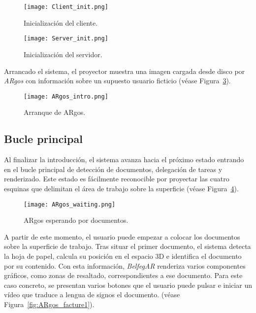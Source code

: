 \begin{figure}[!h]
  \begin{center}
    \texttt{[image: Client\_init.png]}
    \caption{Inicialización del cliente.}
    \label{fig:Client_init}
  \end{center}
\end{figure}

\begin{figure}[!h]
  \begin{center}
    \texttt{[image: Server\_init.png]}
    \caption{Inicialización del servidor.}
    \label{fig:Server_init}
  \end{center}
\end{figure}

Arrancado el sistema, el proyector muestra una imagen cargada desde disco por \textit{ARgos} con información sobre un supuesto usuario ficticio (véase Figura~\ref{fig:ARgos_intro}).

\begin{figure}
  \begin{center}
    \texttt{[image: ARgos\_intro.png]}
    \caption{Arranque de ARgos.}
    \label{fig:ARgos_intro}
  \end{center}
\end{figure}


\subsection{Bucle principal}

Al finalizar la introducción, el sistema avanza hacia el próximo estado entrando en el bucle principal de detección de documentos, delegación de tareas y renderizado. Este estado es fácilmente reconocible por proyectar las cuatro esquinas que delimitan el área de trabajo sobre la superficie (véase Figura~\ref{fig:ARgos_waiting}).

\begin{figure}
  \begin{center}
    \texttt{[image: ARgos\_waiting.png]}
    \caption{ARgos esperando por documentos.}
    \label{fig:ARgos_waiting}
  \end{center}
\end{figure}


A partir de este momento, el usuario puede empezar a colocar los documentos sobre la superficie de trabajo. Tras situar el primer documento, el sistema detecta la hoja de papel, calcula su posición en el espacio 3D e identifica el documento por su contenido. Con esta información, \textit{BelfegAR} renderiza varios componentes gráficos, como zonas de resaltado, correspondientes a ese documento. Para este caso concreto, se presentan varios botones que el usuario puede pulsar e iniciar un vídeo que traduce a lengua de signos el documento. (véase Figura~\ref{fig:ARgos_facture1}).

